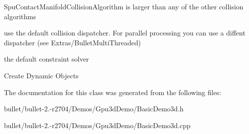 Spu\+Contact\+Manifold\+Collision\+Algorithm is larger than any of the other collision algorithms

use the default collision dispatcher. For parallel processing you can use a diffent dispatcher (see Extras/\+Bullet\+Multi\+Threaded)

the default constraint solver

Create Dynamic Objects 

The documentation for this class was generated from the following files\+:\begin{DoxyCompactItemize}
\item 
bullet/bullet-\/2.-\/r2704/\+Demos/\+Gpu3d\+Demo/Basic\+Demo3d.\+h\item 
bullet/bullet-\/2.-\/r2704/\+Demos/\+Gpu3d\+Demo/Basic\+Demo3d.\+cpp\end{DoxyCompactItemize}

